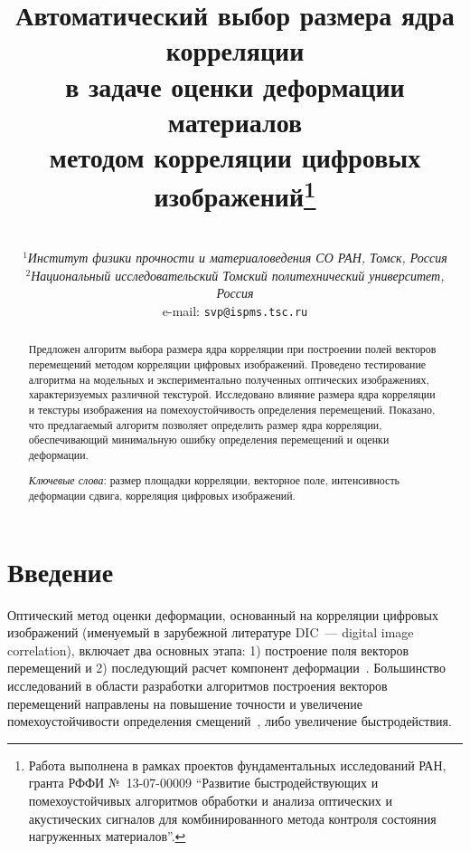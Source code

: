\documentclass[a4paper]{jctart10}
\begin{document}
\setcounter{page}{1}



\title{Автоматический выбор размера ядра корреляции\\в задаче оценки деформации материалов\\методом корреляции цифровых изображений\footnote{Работа выполнена в рамках проектов фундаментальных исследований РАН, гранта РФФИ №~13-07-00009 ``Развитие быстродействующих и помехоустойчивых алгоритмов обработки и анализа оптических и акустических сигналов для комбинированного метода контроля состояния нагруженных материалов''.}}

\author{\\
             $^1${\it Институт физики прочности и материаловедения СО РАН, Томск, Россия}\\
             $^2${\it Национальный исследовательский Томский политехнический университет, Россия}\\
             e-mail: \tt{svp@ispms.tsc.ru}}

    \date{}
     \maketitle

\begin{abstract}
Предложен алгоритм выбора размера ядра корреляции при построении полей векторов перемещений методом корреляции цифровых изображений. Проведено тестирование алгоритма на модельных и экспериментально полученных оптических изображениях, характеризуемых различной текстурой. Исследовано влияние размера ядра корреляции и текстуры изображения на помехоустойчивость определения перемещений. Показано, что предлагаемый алгоритм позволяет определить размер ядра корреляции, обеспечивающий минимальную ошибку определения перемещений и оценки деформации.

{\it Ключевые слова}: размер площадки корреляции, векторное поле, интенсивность деформации сдвига, корреляция цифровых изображений.
\end{abstract}

\section*{Введение}

Оптический метод оценки деформации, основанный на корреляции цифровых изображений (именуемый в зарубежной литературе {DIC}~--- digital image correlation), включает два основных этапа: 1) построение поля векторов перемещений и 2) последующий расчет компонент деформации~\cite{1}. Большинство исследований в области разработки алгоритмов построения векторов перемещений направлены на повышение точности и увеличение помехоустойчивости определения смещений~\cite{2, 3}, либо увеличение быстродействия.
\end{document}
